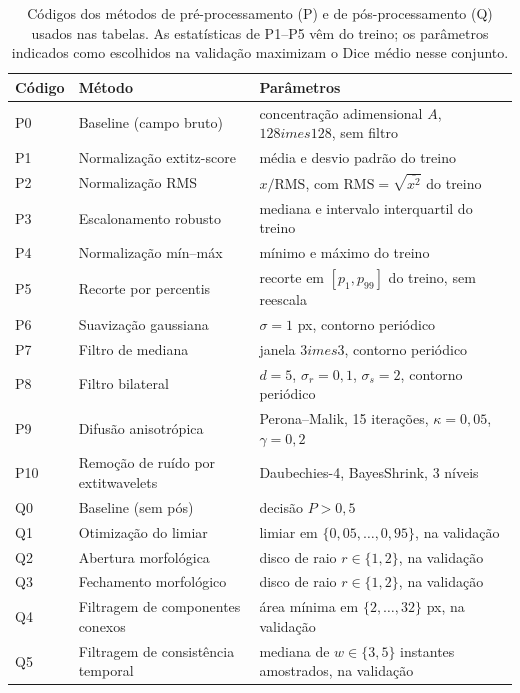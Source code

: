 \begin{table}[htbp]
\centering
\caption{Códigos dos métodos de pré-processamento (P) e de pós-processamento (Q) usados nas tabelas. As estatísticas de P1--P5 vêm do treino; os parâmetros indicados como escolhidos na validação maximizam o Dice médio nesse conjunto.}
\label{tab:metodos}
\footnotesize\setlength{\tabcolsep}{3pt}
\begin{sbcfitwidth}
\begin{tabular}{lll}
\toprule
Código & Método & Parâmetros \\
\midrule
P0 & Baseline (campo bruto) & concentração adimensional $A$, $128	imes128$, sem filtro \\
P1 & Normalização 	extit{z-score} & média e desvio padrão do treino \\
P2 & Normalização RMS & $x/\mathrm{RMS}$, com $\mathrm{RMS}=\sqrt{\overline{x^2}}$ do treino \\
P3 & Escalonamento robusto & mediana e intervalo interquartil do treino \\
P4 & Normalização mín--máx & mínimo e máximo do treino \\
P5 & Recorte por percentis & recorte em $[p_1,p_{99}]$ do treino, sem reescala \\
P6 & Suavização gaussiana & $\sigma=1$ px, contorno periódico \\
P7 & Filtro de mediana & janela $3	imes3$, contorno periódico \\
P8 & Filtro bilateral & $d=5$, $\sigma_r=0{,}1$, $\sigma_s=2$, contorno periódico \\
P9 & Difusão anisotrópica & Perona--Malik, 15 iterações, $\kappa=0{,}05$, $\gamma=0{,}2$ \\
P10 & Remoção de ruído por 	extit{wavelets} & Daubechies-4, BayesShrink, 3 níveis \\
\midrule
Q0 & Baseline (sem pós) & decisão $P>0{,}5$ \\
Q1 & Otimização do limiar & limiar em $\{0{,}05,\dots,0{,}95\}$, na validação \\
Q2 & Abertura morfológica & disco de raio $r\in\{1,2\}$, na validação \\
Q3 & Fechamento morfológico & disco de raio $r\in\{1,2\}$, na validação \\
Q4 & Filtragem de componentes conexos & área mínima em $\{2,\dots,32\}$ px, na validação \\
Q5 & Filtragem de consistência temporal & mediana de $w\in\{3,5\}$ instantes amostrados, na validação \\
\bottomrule
\end{tabular}
\end{sbcfitwidth}
\end{table}
